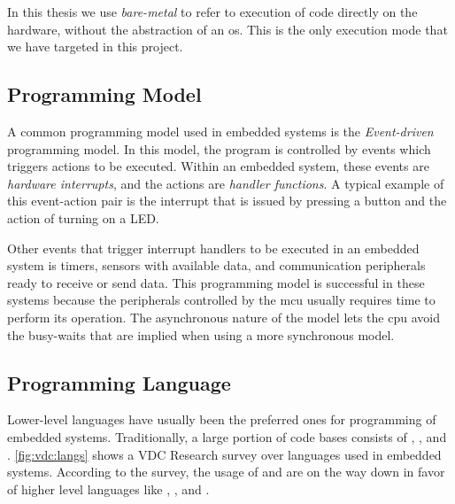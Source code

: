 In this thesis we use \emph{bare-metal} to refer to execution of code directly on the hardware, without the abstraction of an \gls{os}.
This is the only execution mode that we have targeted in this project.

\subsection{Programming Model}

A common programming model used in embedded systems is the \emph{Event-driven} programming model.
In this model, the program is controlled by events which triggers actions to be executed.
Within an embedded system, these events are \emph{hardware interrupts}, and the actions are \emph{handler functions}.
A typical example of this event-action pair is the interrupt that is issued by pressing a button and the action of turning on a LED.

Other events that trigger interrupt handlers to be executed in an embedded system is timers, sensors with available data, and communication peripherals ready to receive or send data.
This programming model is successful in these systems because the peripherals controlled by the \gls{mcu} usually requires time to perform its operation.
The asynchronous nature of the model lets the \gls{cpu} avoid the busy-waits that are implied when using a more synchronous model.

\subsection{Programming Language}

Lower-level languages have usually been the preferred ones for programming of embedded systems.
Traditionally, a large portion of code bases consists of {\C}, , and {\Cpp}.
\autoref{fig:vdc:langs} shows a VDC Research \cite{web:vdc} survey over languages used in embedded systems.
According to the survey, the usage of {\C} and  are on the way down in favor of higher level languages like , , and .

